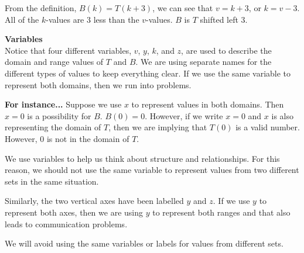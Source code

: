 \documentclass{ximera}
\begin{document}
From the definition, $B(k) = T(k+3)$, we can see that $v=k+3$, or $k=v-3$.  All of the $k$-values are $3$ less than the $v$-values.  $B$ is $T$ shifted left $3$.





\begin{warning} \textbf{\textcolor{red!80!black}{Variables}} \\

Notice that four different variables, $v$, $y$, $k$, and $z$, are used to describe the domain and range values of $T$ and $B$.  We are using separate names for the different types of values to keep everything clear. If we use the same variable to represent both domains, then we run into problems.




\textcolor{blue!55!black}{
\textbf{For instance...} Suppose we use $x$ to represent values in both domains.  Then $x = 0$ is a possibility for $B$.  $B(0) = 0$.  However, if we write $x = 0$ and $x$ is also representing the domain of $T$, then we are implying that $T(0)$ is a valid number.  However, $0$ is not in the domain of $T$.
}


We use variables to help us think about structure and relationships.  For this reason, we should not use the same variable to represent values from two different sets in the same situation.


Similarly, the two vertical axes have been labelled $y$ and $z$.  If we use $y$ to represent both axes, then we are using $y$ to represent both ranges and that also leads to communication problems.

We will avoid using the same variables or labels for values from different sets.

\end{warning}
\end{document}
